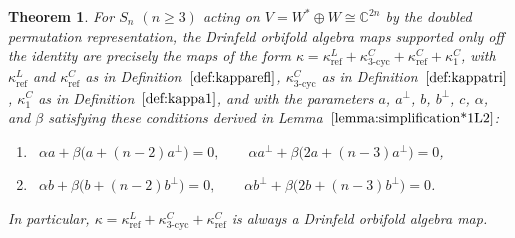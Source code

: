 \documentclass[pdftex]{sigma}
\numberwithin{equation}{section}
\newtheorem{Theorem}{Theorem}[section]
\DeclareMathOperator{\refl}{ref}
\DeclareMathOperator{\tri}{3-cyc}
\begin{document}
\begin{Theorem}\label{thm:DOAMapsDoubledPerm}
For $S_n$ $(n \geq 3)$ acting on $V=W^* \oplus W \cong \mathbb{C}^{2n}$ by the
doubled permutation representation, the Drinfeld orbifold algebra maps
supported only off the identity are precisely the maps of the form
$\kappa=\kappa^L_{\refl}+\kappa^C_{\tri}+\kappa^C_{\refl}+\kappa^C_1$, with
$\kappa^L_{\refl}$ and $\kappa^C_{\refl}$ as in Definition~$\ref{def:kapparefl}$,
$\kappa^C_{\tri}$ as in Definition~$\ref{def:kappatri}$, $\kappa^C_1$
as in Definition~$\ref{def:kappa1}$, and with the parameters
$a$, $a^\perp$, $b$, $b^\perp$, $c$, $\alpha$, and $\beta$ satisfying
these conditions derived in Lemma~$\ref{lemma:simplification*1L2}$:
\begin{enumerate}	\itemsep=0pt
	\item[\eqref{Obstr2PhiC1C2C3L2=0a}] \ $\alpha a + \beta\big(a+(n-2)a^\perp\big)=0, \qquad \alpha a^\perp + \beta\big(2a+(n-3)a^\perp\big)=0$,
	\item[\eqref{Obstr2PhiC1C2C3L2=0b}] \ $\alpha b + \beta\big(b+(n-2)b^\perp\big)=0, \qquad \alpha b^\perp + \beta\big(2b+(n-3)b^\perp\big)=0$.
\end{enumerate}
In particular, $\kappa=\kappa^L_{\refl}+\kappa^C_{\tri}+\kappa^C_{\refl}$ is
always a Drinfeld orbifold algebra map.
\end{Theorem}
\end{document}
